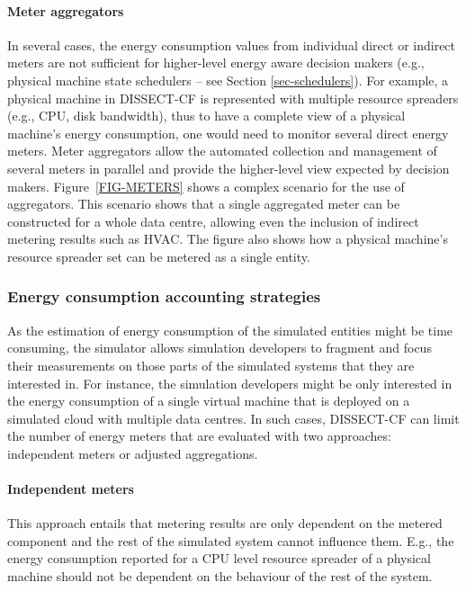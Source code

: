 \documentclass[sort, compress, 5p]{elsarticle}
\begin{document}
\paragraph{Meter aggregators} In several cases, the energy consumption values from individual direct or indirect meters are not sufficient for higher-level energy aware decision makers (e.g., physical machine state schedulers -- see Section \ref{sec-schedulers}). For example, a physical machine in DISSECT-CF is represented with multiple resource spreaders (e.g., CPU, disk bandwidth), thus to have a complete view of a physical machine's energy consumption, one would need to monitor several direct energy meters. Meter aggregators allow the automated collection and management of several meters in parallel and provide the higher-level view expected by decision makers. Figure~\ref{FIG-METERS} shows a complex scenario for the use of aggregators. This scenario shows that a single aggregated meter can be constructed for a whole data centre, allowing even the inclusion of indirect metering results such as HVAC. The figure also shows how a physical machine's resource spreader set can be metered as a single entity.

\subsubsection{Energy consumption accounting strategies}

As the estimation of energy consumption of the simulated entities might be time consuming, the simulator allows simulation developers to fragment and focus their measurements on those parts of the simulated systems that they are interested in. For instance, the simulation developers might be only interested in the energy consumption of a single virtual machine that is deployed on a simulated cloud with multiple data centres. In such cases, DISSECT-CF can limit the number of energy meters that are evaluated with two approaches: independent meters or adjusted aggregations.

\paragraph{Independent meters} This approach entails that metering results are only dependent on the metered component and the rest of the simulated system cannot influence them. E.g., the energy consumption reported for a CPU level resource spreader of a physical machine should not be dependent on the behaviour of the rest of the system.
\end{document}
